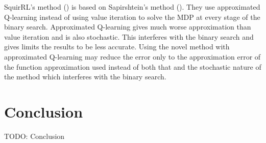 \documentclass{article}
\begin{document}
SquirRL's method (\cite{hou2019squirrl}) is based on Sapirshtein's method (\cite{sapirshtein2016optimal}). They use approximated Q-learning instead of using value iteration to solve the MDP at every stage of the binary search. Approximated Q-learning gives much worse approximation than value iteration and is also stochastic. This interferes with the binary search and gives limits the results to be less accurate. Using the novel method with approximated Q-learning may reduce the error only to the approximation error of the function approximation used instead of both that and the stochastic nature of the method which interferes with the binary search.

\section{Conclusion}
TODO: Conclusion



\end{document}

